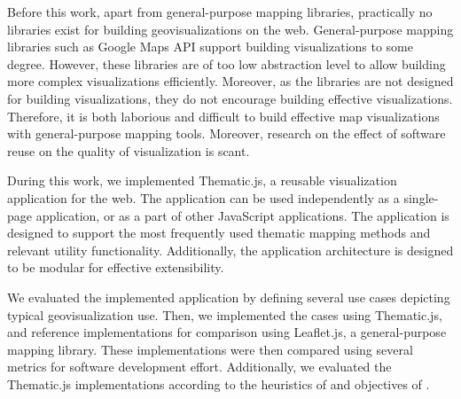 
Before this work, apart from general-purpose mapping libraries, practically no libraries exist for building geovisualizations on the web. General-purpose mapping libraries such as Google Maps API support building visualizations to some degree. However, these libraries are of too low abstraction level to allow building more complex visualizations efficiently. Moreover, as the libraries are not designed for building visualizations, they do not encourage building effective visualizations. Therefore, it is both laborious and difficult to build effective map visualizations with general-purpose mapping tools. Moreover, research on the effect of software reuse on the quality of visualization is scant.

During this work, we implemented Thematic.js, a reusable visualization application for the web. The application can be used independently as a single-page application, or as a part of other JavaScript applications. The application is designed to support the most frequently used thematic mapping methods and relevant utility functionality. Additionally, the application architecture is designed to be modular for effective extensibility.

We evaluated the implemented application by defining several use cases depicting typical geovisualization use. Then, we implemented the cases using Thematic.js, and reference implementations for comparison using Leaflet.js, a general-purpose mapping library. These implementations were then compared using several metrics for software development effort. Additionally, we evaluated the Thematic.js implementations according to the heuristics of \citet{zuk_heuristics_2006} and objectives of \citet{schlichtmann_visualization_2002}.

